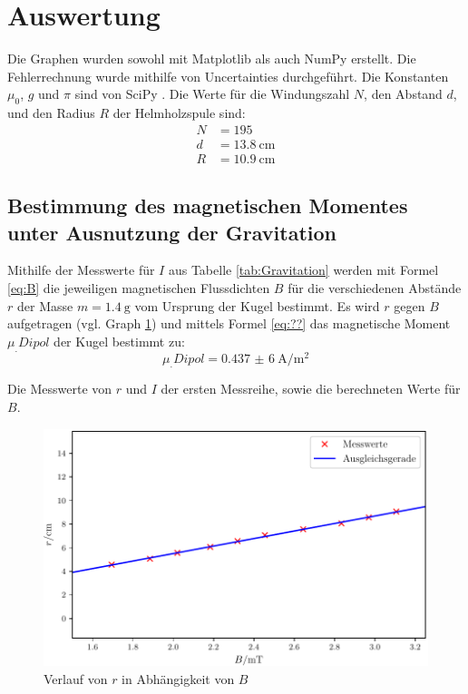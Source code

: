 \section{Auswertung}
\label{sec:Auswertung}

Die Graphen wurden sowohl mit Matplotlib \cite{matplotlib} als auch NumPy \cite{numpy} erstellt. 
Die Fehlerrechnung wurde mithilfe von Uncertainties \cite{uncertainties} durchgeführt.
Die Konstanten $\mu_0$, $g$ und $\pi$ sind von SciPy \cite{scipy}.
Die Werte für die Windungszahl $N$, den Abstand $d$, und den Radius $R$ der Helmholzspule sind:
\begin{align*}
N &= 195\\
d &= \SI{13,8}{\centi\metre}\\
R &= \SI{10,9}{\centi\metre}
\end{align*}

\subsection{Bestimmung des magnetischen Momentes unter Ausnutzung der Gravitation}

Mithilfe der Messwerte für $I$ aus Tabelle \ref{tab:Gravitation} werden mit Formel \eqref{eq:B} die jeweiligen magnetischen Flussdichten $B$ für die verschiedenen Abstände $r$ der Masse $m=\SI{1,4}{\gram}$ vom Ursprung der Kugel bestimmt. Es wird $r$ gegen $B$ aufgetragen (vgl. Graph \ref{fig:Gravitation}) und mittels Formel \eqref{eq:??} das magnetische Moment $\mu_.{Dipol}$ der Kugel bestimmt zu:
\begin{equation*}
\mu_.{Dipol} = \SI{0,437(6)}{\ampere\per\metre\squared}
\end{equation*}  
\begin{table}
  	\centering
  	\caption{Die Messwerte von $r$ und $I$ der ersten Messreihe, sowie die berechneten Werte für $B$.}
  	\label{tab:Gravitation}
\end{table}
\begin{figure}
	\centering
	\includegraphics[scale = 1,keepaspectratio]
	{content/images/Gravitation.pdf}
	\caption{Verlauf von $r$ in Abhängigkeit von $B$}
	\label{fig:Gravitation}
\end{figure}
